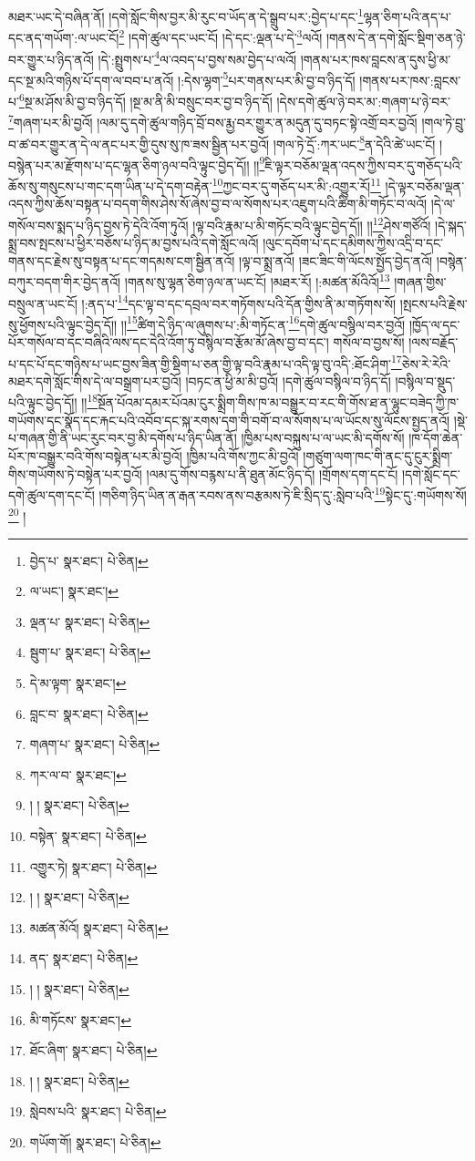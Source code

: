 མཐར་ཡང་དེ་བཞིན་ནོ། །དགེ་སློང་གིས་བྱར་མི་རུང་བ་ཡོད་ན་དེ་སྒྲུབ་པར་:བྱེད་པ་དང་\footnote{བྱེད་པ་  སྣར་ཐང་།  པེ་ཅིན། }ལྷན་ཅིག་པའི་ནད་པ་དང་ནད་གཡོག་:ལ་ཡང་ངོ།\footnote{ལ་ཡང་།  སྣར་ཐང་། } །དགེ་ཚུལ་དང་ཡང་ངོ། །དེ་དང་:ལྡན་པ་དེ་\footnote{ལྡན་པ་  སྣར་ཐང་།  པེ་ཅིན། }ལའོ། །གནས་དེ་ན་དགེ་སློང་སྡིག་ཅན་ཉེ་བར་གྱུར་པ་ཉིད་ནའོ། །དེ་:སྤྲུགས་པ་\footnote{སྦུག་པ་  སྣར་ཐང་།  པེ་ཅིན། }ལ་འབད་པ་བྱས་སམ་བྱེད་པ་ལའོ། །གནས་པར་ཁས་བླངས་ན་དུས་ཕྱི་མ་དང་སྔ་མའི་གཉིས་པོ་དག་ལ་བབ་པ་ནའོ། །:དེས་ལྷག་\footnote{དེ་མ་ལྟག་  སྣར་ཐང་། }པར་གནས་པར་མི་བྱ་བ་ཉིད་དོ། །གནས་པར་ཁས་:བླངས་པ་\footnote{བླང་བ་  སྣར་ཐང་།  པེ་ཅིན། }སྔ་མ་ཤོས་མི་བྱ་བ་ཉིད་དོ། །སྔ་མ་ནི་མི་བསྲུང་བར་བྱ་བ་ཉིད་དོ། །དེས་དགེ་ཚུལ་ཉེ་བར་མ་:གཞག་པ་ཉེ་བར་\footnote{གཞག་པ་  སྣར་ཐང་།  པེ་ཅིན། }གཞག་པར་མི་བྱའོ། །ལམ་དུ་དགེ་ཚུལ་གཉིད་བྲོ་བས་རྨྱ་བར་གྱུར་ན་མདུན་དུ་བཏང་སྟེ་འགྲོ་བར་བྱའོ། །གལ་ཏེ་བྲུ་བ་ཚ་བར་གྱུར་ན་དེ་ལ་ནང་པར་གྱི་དུས་སུ་ཁ་ཟས་སྦྱིན་པར་བྱའོ། །གལ་ཏེ་དྲོ་:ཀར་ཡང་\footnote{ཀར་ལ་བ་  སྣར་ཐང་། }ན་དེའི་ཚེ་ཡང་ངོ། །བསྙེན་པར་མ་རྫོགས་པ་དང་ལྷན་ཅིག་ཉལ་བའི་ལྟུང་བྱེད་དོ།། །།\footnote{། །  སྣར་ཐང་།  པེ་ཅིན། }ཇི་ལྟར་བཅོམ་ལྡན་འདས་ཀྱིས་བར་དུ་གཅོད་པའི་ཆོས་སུ་གསུངས་པ་གང་དག་ཡིན་པ་དེ་དག་བརྟེན་\footnote{བསྟེན་  སྣར་ཐང་།  པེ་ཅིན། }ཀྱང་བར་དུ་གཅོད་པར་མི་:འགྱུར་རོ།\footnote{འགྱུར་ཏེ།  སྣར་ཐང་།  པེ་ཅིན། } །དེ་ལྟར་བཅོམ་ལྡན་འདས་ཀྱིས་ཆོས་བསྟན་པ་བདག་གིས་ཤེས་སོ་ཞེས་བྱ་བ་ལ་སོགས་པར་འཇུག་པའི་ཚིག་མི་གཏོང་བ་ལའོ། །དེ་ལ་གསོལ་བས་སྨད་པ་ཉིད་བྱས་ཏེ་དེའི་འོག་ཏུའོ། །ལྟ་བའི་རྣམ་པ་མི་གཏོང་བའི་ལྟུང་བྱེད་དོ།། །།\footnote{། །  སྣར་ཐང་།  པེ་ཅིན། }ཤེས་གཙོའོ། །དེ་སྐད་སྨྲ་བས་སྤངས་པ་ཕྱིར་བཅོས་པ་ཉིད་མ་བྱས་པའི་དགེ་སློང་ལའོ། །ལུང་དབོག་པ་དང་དམིགས་ཀྱིས་འདྲི་བ་དང་གནས་དང་རྗེས་སུ་བསྟན་པ་དང་གདམས་ངག་སྦྱིན་ནའོ། །ལྟ་བ་སྨྲ་ནའོ། །ཟང་ཟིང་གི་ལོངས་སྤྱོད་བྱེད་ནའོ། །བསྙེན་བཀུར་བདག་གིར་བྱེད་ནའོ། །གནས་སུ་ལྷན་ཅིག་ཉལ་ན་ཡང་ངོ། །མཐར་རོ། །:མཚན་མོའིའོ།\footnote{མཚན་མོའོ།  སྣར་ཐང་།  པེ་ཅིན། } །གཞན་གྱིས་བསྲུལ་ན་ཡང་ངོ། །:ནད་པ་\footnote{ནད་  སྣར་ཐང་།  པེ་ཅིན། }དང་ལྟ་བ་དང་དབྲལ་བར་གཏོགས་པའི་དོན་གྱིས་ནི་མ་གཏོགས་སོ། །སྤངས་པའི་རྗེས་སུ་ཕྱོགས་པའི་ལྟུང་བྱེད་དོ།། །།\footnote{། །  སྣར་ཐང་།  པེ་ཅིན། }ཚིག་དེ་ཉིད་ལ་ཞུགས་པ་:མི་གཏོང་ན་\footnote{མི་གཏོངས་  སྣར་ཐང་། }དགེ་ཚུལ་བསྙིལ་བར་བྱའོ། །ཁྱོད་ལ་དང་པོར་གསོལ་བ་དང་བཞིའི་ལས་དང་དེའི་འོག་ཏུ་བསྙིལ་བ་རྩོམ་མོ་ཞེས་བྱ་བ་དང་། གསོལ་བ་བྱས་སོ། །ལས་བརྗོད་པ་དང་པོ་དང་གཉིས་པ་ཡང་བྱས་ཟིན་གྱི་སྡིག་པ་ཅན་གྱི་ལྟ་བའི་རྣམ་པ་འདི་ལྟ་བུ་འདི་:ཐོང་ཤིག་\footnote{ཐོང་ཞིག་  སྣར་ཐང་།  པེ་ཅིན། }ཅེས་རེ་རེའི་མཐར་དགེ་སློང་གིས་དེ་ལ་བསྒྲག་པར་བྱའོ། །བཏང་ན་ཕྱི་མ་མི་བྱའོ། །དགེ་ཚུལ་བསྙིལ་བ་ཉིད་དོ། །བསྙིལ་བ་སྡུད་པའི་ལྟུང་བྱེད་དོ།། །།\footnote{། །  སྣར་ཐང་།  པེ་ཅིན། }སྔོན་པོའམ་དམར་པོའམ་ངུར་སྨྲིག་གིས་ཁ་མ་བསྒྱུར་བ་རང་གི་གོས་ཐ་ན་ལྷུང་བཟེད་ཀྱི་ཁ་གཡོགས་དང་སྣོད་དང་རྐང་པའི་འབོབ་དང་སྐ་རགས་དག་གི་བགོ་བ་ལ་སོགས་པ་ལ་ཡོངས་སུ་ལོངས་སྤྱད་ནའོ། །སྡེ་པ་གཞན་གྱི་ནི་ཡང་རུང་བར་བྱ་མི་དགོས་པ་ཉིད་ཡིན་ནོ། །ཁྱིམ་པས་བསྐུས་པ་ལ་ཡང་མི་དགོས་སོ། །ཁ་དོག་ཆེན་པོར་ཁ་བསྒྱུར་བའི་གོས་བསྟེན་པར་མི་བྱའོ། །ཁྱིམ་པའི་གོས་ཀྱང་མི་བྱའོ། །གཙུག་ལག་ཁང་གི་ནང་དུ་ངུར་སྨྲིག་གིས་གཡོགས་ཏེ་བསྟེན་པར་བྱའོ། །ལམ་དུ་གོས་བརྙས་པ་ནི་ཐུན་མོང་ཉིད་དོ། །གྲོགས་དག་དང་ངོ། །དགེ་སློང་དང་དགེ་ཚུལ་དག་དང་ངོ། །གཅིག་ཉིད་ཡིན་ན་རྒན་རབས་ནས་བརྩམས་ཏེ་ཇི་སྲིད་དུ་:སླེབ་པའི་\footnote{སླེབས་པའི་  སྣར་ཐང་།  པེ་ཅིན། }སྟེང་དུ་:གཡོགས་སོ།\footnote{གཡོག་གོ།  སྣར་ཐང་།  པེ་ཅིན། } །
